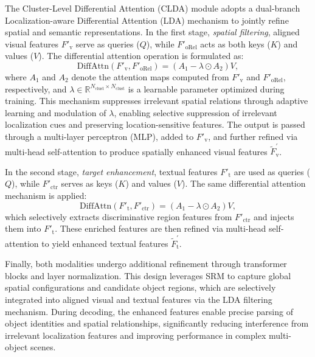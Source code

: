 \documentclass[letterpaper]{article} %
\begin{document}
The Cluster-Level Differential Attention (CLDA) module adopts a dual-branch Localization-aware Differential Attention (LDA) mechanism to jointly refine spatial and semantic representations. In the first stage, \textit{spatial filtering}, aligned visual features $F'_{\mathrm{v}}$ serve as queries ($Q$), while $F'_{\mathrm{oRel}}$ acts as both keys ($K$) and values ($V$). The differential attention operation is formulated as:
\begin{equation}
	\text{DiffAttn}(F'_{\mathrm{v}}, F'_{\mathrm{oRel}}) = (A_1 - \lambda \odot A_2)V,
	\label{eq:f_v_oRel2}
\end{equation}
where $A_1$ and $A_2$ denote the attention maps computed from $F'_{\mathrm{v}}$ and $F'_{\mathrm{oRel}}$, respectively, and $\lambda \in \mathbb{R}^{N_{\mathrm{clust}} \times N_{\mathrm{clust}}}$ is a learnable parameter optimized during training. This mechanism suppresses irrelevant spatial relations through adaptive learning and modulation of $\lambda$, enabling selective suppression of irrelevant localization cues and preserving location-sensitive features. The output is passed through a multi-layer perceptron (MLP), added to $F'_{\mathrm{v}}$, and further refined via multi-head self-attention to produce spatially enhanced visual features $\tilde{F}_{\mathrm{v}}^{\prime}$.

In the second stage, \textit{target enhancement}, textual features $F'_{\mathrm{t}}$ are used as queries ($Q$), while $F'_{\mathrm{ctr}}$ serves as keys ($K$) and values ($V$). The same differential attention mechanism is applied:
\begin{equation}
	\text{DiffAttn}(F'_{\mathrm{t}}, F'_{\mathrm{ctr}}) = (A_1 - \lambda \odot A_2)V,
\end{equation}
which selectively extracts discriminative region features from $F'_{\mathrm{ctr}}$ and injects them into $F'_{\mathrm{t}}$. These enriched features are then refined via multi-head self-attention to yield enhanced textual features $\tilde{F}_{\mathrm{t}}^{\prime}$.

Finally, both modalities undergo additional refinement through transformer blocks and layer normalization. This design leverages SRM to capture global spatial configurations and candidate object regions, which are selectively integrated into aligned visual and textual features via the LDA filtering mechanism. During decoding, the enhanced features enable precise parsing of object identities and spatial relationships, significantly reducing interference from irrelevant localization features and improving performance in complex multi-object scenes.
\end{document}

